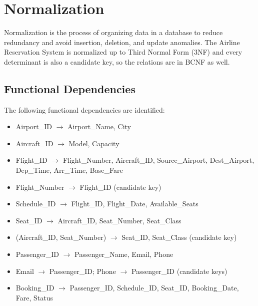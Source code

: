 \documentclass[12pt,a4paper]{article}
\begin{document}
\section{Normalization}
Normalization is the process of organizing data in a database to reduce redundancy and avoid insertion,
deletion, and update anomalies. The Airline Reservation System is normalized up to Third Normal Form (3NF)
and every determinant is also a candidate key, so the relations are in BCNF as well.

\subsection{Functional Dependencies}
The following functional dependencies are identified:
\begin{itemize}[nosep]
  \item Airport_ID $\rightarrow$ Airport_Name, City
  \item Aircraft_ID $\rightarrow$ Model, Capacity
  \item Flight_ID $\rightarrow$ Flight_Number, Aircraft_ID, Source_Airport, Dest_Airport, Dep_Time, Arr_Time, Base_Fare
  \item Flight_Number $\rightarrow$ Flight_ID \hfill (candidate key)
  \item Schedule_ID $\rightarrow$ Flight_ID, Flight_Date, Available_Seats
  \item Seat_ID $\rightarrow$ Aircraft_ID, Seat_Number, Seat_Class
  \item (Aircraft_ID, Seat_Number) $\rightarrow$ Seat_ID, Seat_Class \hfill (candidate key)
  \item Passenger_ID $\rightarrow$ Passenger_Name, Email, Phone
  \item Email $\rightarrow$ Passenger_ID; \quad Phone $\rightarrow$ Passenger_ID \hfill (candidate keys)
  \item Booking_ID $\rightarrow$ Passenger_ID, Schedule_ID, Seat_ID, Booking_Date, Fare, Status
\end{itemize}
\end{document}
